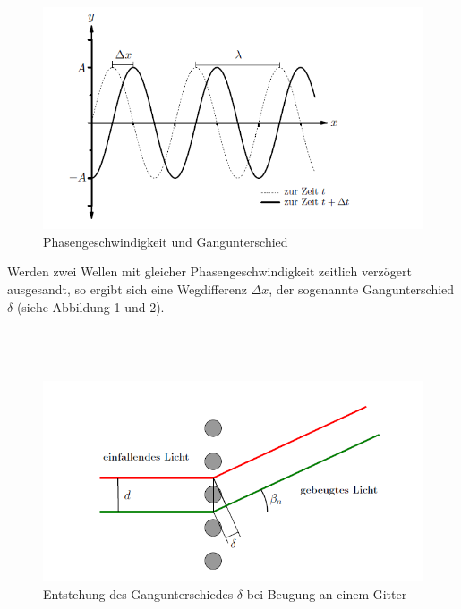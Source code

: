 \documentclass[12pt,a4paper,titlepage,headinclude,bibtotoc]{scrartcl}
\begin{document}
\begin{figure} [h]
\begin{center}
\includegraphics[scale=0.75]{Phasengeschwindigkeit2.png} \end{center}
\caption {Phasengeschwindigkeit und Gangunterschied \protect\footnotemark }
\end{figure}

Werden zwei Wellen mit gleicher Phasengeschwindigkeit zeitlich verzögert ausgesandt, so ergibt sich eine Wegdifferenz $\Delta x$, der sogenannte Gangunterschied $\delta$  (siehe Abbildung 1 und 2).\\\\\\\\


\begin{figure} [h!]
\begin{center}
\includegraphics[scale=0.65]{Gangunterschied.png} \end{center}
\caption [Entstehung des Gangunterschiedes $\delta$ bei Beugung an einem Gitter] {Entstehung des Gangunterschiedes $\delta$ bei Beugung an einem Gitter \protect\footnotemark }

\end{figure}
\end{document}
